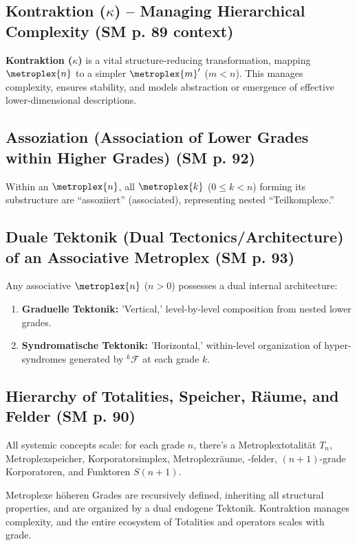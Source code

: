 \documentclass[
    12pt,              %
    a4paper,           %
    headings=normal,   %
    twoside=true,      %
    BCOR=8mm,          %
]{scrbook}
\newcommand{\q}[1]{\enquote{#1}}
\newcommand{\metroplexsynkolator}[1]{{}^{#1}\mathcal{F}}
\newcommand{\metroplextotalitaet}[1]{T_{#1}}
\newcommand{\metroplexfunktor}{S}
\begin{document}
\subsection{Kontraktion (\(\kappa\)) – Managing Hierarchical Complexity (SM p. 89 context)}
\label{sec:ch5_kontraktion}
\textbf{Kontraktion (\(\kappa\))} is a vital structure-reducing transformation, mapping \(\metroplex{n}\) to a simpler \(\metroplex{m}'\) (\(m<n\)). This manages complexity, ensures stability, and models abstraction or emergence of effective lower-dimensional descriptions.

\subsection{Assoziation (Association of Lower Grades within Higher Grades) (SM p. 92)}
\label{sec:ch5_assoziation}
Within an \(\metroplex{n}\), all \(\metroplex{k}\) (\(0 \le k < n\)) forming its substructure are \q{assoziiert} (associated), representing nested \q{Teilkomplexe.}

\subsection{Duale Tektonik (Dual Tectonics/Architecture) of an Associative Metroplex (SM p. 93)}
\label{sec:ch5_duale_tektonik}
Any associative \(\metroplex{n}\) (\(n>0\)) possesses a dual internal architecture:
\begin{enumerate}
    \item  \textbf{Graduelle Tektonik:} 'Vertical,' level-by-level composition from nested lower grades.
    \item  \textbf{Syndromatische Tektonik:} 'Horizontal,' within-level organization of hyper-syndromes generated by \(\metroplexsynkolator{k}\) at each grade \(k\).
\end{enumerate}

\subsection{Hierarchy of Totalities, Speicher, Räume, and Felder (SM p. 90)}
\label{sec:ch5_hierarchy_totalities}
All systemic concepts scale: for each grade \(n\), there's a Metroplextotalität \(\metroplextotalitaet{n}\), Metroplexspeicher, Korporatorsimplex, Metroplexräume, -felder, \((n+1)\)-grade Korporatoren, and Funktoren \(\metroplexfunktor(n+1)\).

Metroplexe höheren Grades are recursively defined, inheriting all structural properties, and are organized by a dual endogene Tektonik. Kontraktion manages complexity, and the entire ecosystem of Totalities and operators scales with grade.
\end{document}
